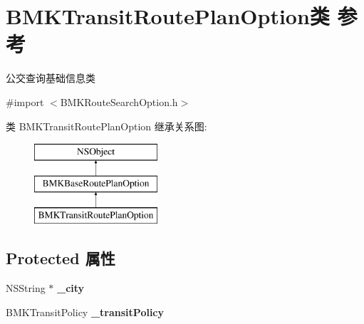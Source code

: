 \hypertarget{interface_b_m_k_transit_route_plan_option}{}\section{B\+M\+K\+Transit\+Route\+Plan\+Option类 参考}
\label{interface_b_m_k_transit_route_plan_option}


公交查询基础信息类  




{\ttfamily \#import $<$B\+M\+K\+Route\+Search\+Option.\+h$>$}

类 B\+M\+K\+Transit\+Route\+Plan\+Option 继承关系图\+:\begin{figure}[H]
\begin{center}
\leavevmode
\includegraphics[height=3.000000cm]{interface_b_m_k_transit_route_plan_option}
\end{center}
\end{figure}
\subsection*{Protected 属性}
\begin{DoxyCompactItemize}
\item 
\hypertarget{interface_b_m_k_transit_route_plan_option_affceafe01e258cc5ede4f29c75ac9062}{}N\+S\+String $\ast$ {\bfseries \+\_\+city}\label{interface_b_m_k_transit_route_plan_option_affceafe01e258cc5ede4f29c75ac9062}

\item 
\hypertarget{interface_b_m_k_transit_route_plan_option_abd1d6515bb16bea503eca019739d5ffd}{}B\+M\+K\+Transit\+Policy {\bfseries \+\_\+transit\+Policy}\label{interface_b_m_k_transit_route_plan_option_abd1d6515bb16bea503eca019739d5ffd}

\end{DoxyCompactItemize}

